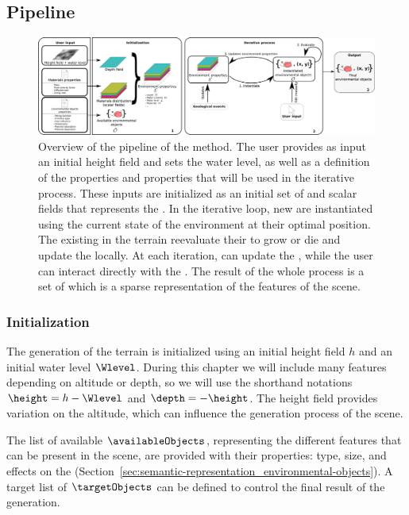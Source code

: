 \subsection{Pipeline}

\begin{figure}
    \includegraphics{Figures/pipeline.pdf}
    \caption{Overview of the pipeline of the method. The user provides as input an initial height field and sets the water level, as well as a definition of the  properties and  properties that will be used in the iterative process. These inputs are initialized as an initial set of  and scalar fields that represents the . In the iterative loop, new  are instantiated using the current state of the environment at their optimal position. The existing  in the terrain reevaluate their  to grow or die and update the  locally. At each iteration,  can update the , while the user can interact directly with the . The result of the whole process is a set of  which is a sparse representation of the features of the scene. }
    \label{fig:semantic-representation_pipeline}
\end{figure}

\subsubsection{Initialization}

The generation of the terrain is initialized using an initial height field $h$ and an initial water level $\Wlevel$. 
During this chapter we will include many features depending on altitude or depth, so we will use the shorthand notations $\height = h - \Wlevel$ and $\depth = -\height$. The height field provides variation on the altitude, which can influence the generation process of the scene.

The list of available  $\availableObjects$, representing the different features that can be present in the scene, are provided with their properties: type, size,  and effects on the  (Section~\ref{sec:semantic-representation_environmental-objects}). A target list of  $\targetObjects$ can be defined to control the final result of the generation.

